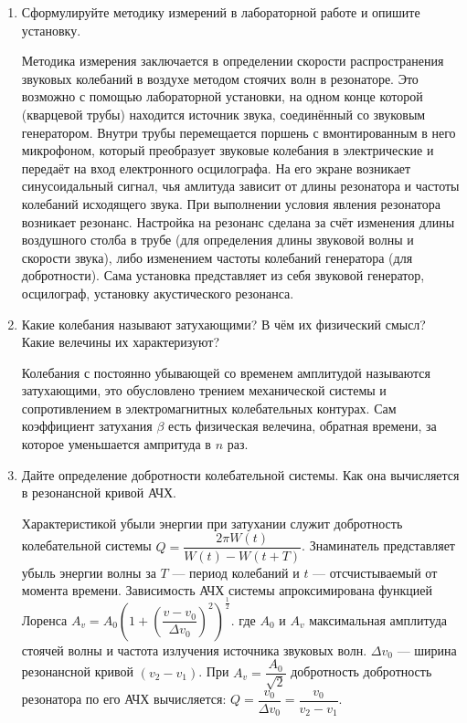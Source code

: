 \documentclass[12pt,a4paper]{article}%
\begin{document}
\begin{enumerate}
	\item Сформулируйте методику измерений в лабораторной работе и опишите установку.
	
	Методика измерения заключается в определении скорости распространения звуковых колебаний в воздухе методом стоячих волн в резонаторе. Это возможно с помощью лабораторной установки, на одном конце которой (кварцевой трубы) находится источник звука, соединённый со звуковым генератором. Внутри трубы перемещается поршень с вмонтированным в него микрофоном, который преобразует звуковые колебания в электрические и передаёт на вход електронного осцилографа. На его экране возникает синусоидальный сигнал, чья амлитуда зависит от длины резонатора и частоты колебаний исходящего звука. При выполнении условия явления резонатора возникает резонанс. Настройка на резонанс сделана за счёт изменения длины воздушного столба в трубе (для определения длины звуковой волны и скорости звука), либо изменением частоты колебаний генератора (для добротности). Сама установка представляет из себя звуковой генератор, осцилограф, установку акустического резонанса.
	
	\item Какие колебания называют затухающими? В чём их физический смысл? Какие велечины их характеризуют?
	
	Колебания с постоянно убывающей со временем амплитудой называются затухающими, это обусловлено трением механической системы и сопротивлением в электромагнитных колебательных контурах. Сам коэффициент затухания $ \beta $ есть физическая велечина, обратная времени, за которое уменьшается ампритуда в $ n $ раз.
	
	\item Дайте определение добротности колебательной системы. Как она вычисляется в резонансной кривой АЧХ.
	
	Характеристикой убыли энергии при затухании служит добротность колебательной системы $ Q = \dfrac{2 \pi W (t)}{W(t) - W(t+T)} $. Знаминатель представляет убыль энергии волны за $ T $ --- период колебаний и $ t $ --- отсчистываемый от момента времени. Зависимость АЧХ системы апроксимирована функцией Лоренса $ A_{v} = A_{0}(1+(\dfrac{v-v_{0}}{\Delta v_{0}})^{2})^{\dfrac{_1}{^2}} $. где $ A_{0} $ и $ A_{v} $ максимальная амплитуда стоячей волны и частота излучения источника звуковых волн. $ \Delta v_{0} $ --- ширина резонансной кривой
	$ (v_2 - v_1) $. При $ A_v = \dfrac{A_0}{\sqrt{2}} $ добротность добротность резонатора по его АЧХ вычисляется: $ Q = \dfrac{v_0}{\Delta v_0} = \dfrac{v_0}{v_2 - v_1} $.
	

\end{enumerate}
\end{document}
